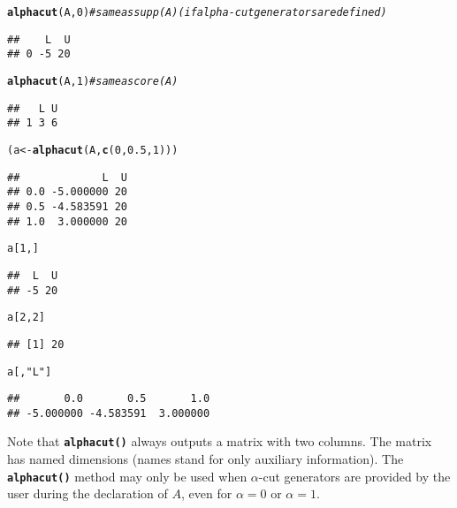 \documentclass[11pt]{article}\usepackage[]{graphicx}\usepackage[]{color}
\makeatletter
\newcommand{\hlnum}[1]{\textcolor[rgb]{0.686,0.059,0.569}{#1}}%
\newcommand{\hlstr}[1]{\textcolor[rgb]{0.192,0.494,0.8}{#1}}%
\newcommand{\hlcom}[1]{\textcolor[rgb]{0.678,0.584,0.686}{\textit{#1}}}%
\newcommand{\hlstd}[1]{\textcolor[rgb]{0.345,0.345,0.345}{#1}}%
\newcommand{\hlkwb}[1]{\textcolor[rgb]{0.69,0.353,0.396}{#1}}%
\newcommand{\hlkwd}[1]{\textcolor[rgb]{0.737,0.353,0.396}{\textbf{#1}}}%
\newenvironment{kframe}{%
 \def\at@end@of@kframe{}%
 \ifinner\ifhmode%
  \def\at@end@of@kframe{\end{minipage}}%
  \begin{minipage}{\columnwidth}%
 \fi\fi%
 \def\FrameCommand##1{\hskip\@totalleftmargin \hskip-\fboxsep
 \colorbox{shadecolor}{##1}\hskip-\fboxsep
     \hskip-\linewidth \hskip-\@totalleftmargin \hskip\columnwidth}%
 \MakeFramed {\advance\hsize-\width
   \@totalleftmargin\z@ \linewidth\hsize
   \@setminipage}}%
 {\par\unskip\endMakeFramed%
 \at@end@of@kframe}
\newenvironment{knitrout}{}{} %
\newcommand{\func}[1]{\texttt{\hlkwd{#1}}}
\makeatother
\begin{document}
\begin{knitrout}\small
{}\color{fgcolor}\begin{kframe}
\begin{alltt}
\hlkwd{alphacut}\hlstd{(A,} \hlnum{0}\hlstd{)} \hlcom{# same as supp(A) (if alpha-cut generators are defined)}
\end{alltt}
\begin{verbatim}
##    L  U
## 0 -5 20
\end{verbatim}
\begin{alltt}
\hlkwd{alphacut}\hlstd{(A,} \hlnum{1}\hlstd{)} \hlcom{# same as core(A)}
\end{alltt}
\begin{verbatim}
##   L U
## 1 3 6
\end{verbatim}
\begin{alltt}
\hlstd{(a} \hlkwb{<-} \hlkwd{alphacut}\hlstd{(A,} \hlkwd{c}\hlstd{(}\hlnum{0}\hlstd{,} \hlnum{0.5}\hlstd{,} \hlnum{1}\hlstd{)))}
\end{alltt}
\begin{verbatim}
##             L  U
## 0.0 -5.000000 20
## 0.5 -4.583591 20
## 1.0  3.000000 20
\end{verbatim}
\begin{alltt}
\hlstd{a[}\hlnum{1}\hlstd{, ]}
\end{alltt}
\begin{verbatim}
##  L  U 
## -5 20
\end{verbatim}
\begin{alltt}
\hlstd{a[}\hlnum{2}\hlstd{,} \hlnum{2}\hlstd{]}
\end{alltt}
\begin{verbatim}
## [1] 20
\end{verbatim}
\begin{alltt}
\hlstd{a[,} \hlstr{"L"}\hlstd{]}
\end{alltt}
\begin{verbatim}
##       0.0       0.5       1.0 
## -5.000000 -4.583591  3.000000
\end{verbatim}
\end{kframe}
\end{knitrout}

\noindent
Note that \func{alphacut()} always outputs a matrix with two columns.
The matrix has named dimensions (names stand for only auxiliary information).
The \func{alphacut()} method may only be used when $\alpha$-cut generators are
provided by the user during the declaration of $A$, even for $\alpha=0$
or $\alpha=1$.
\end{document}
